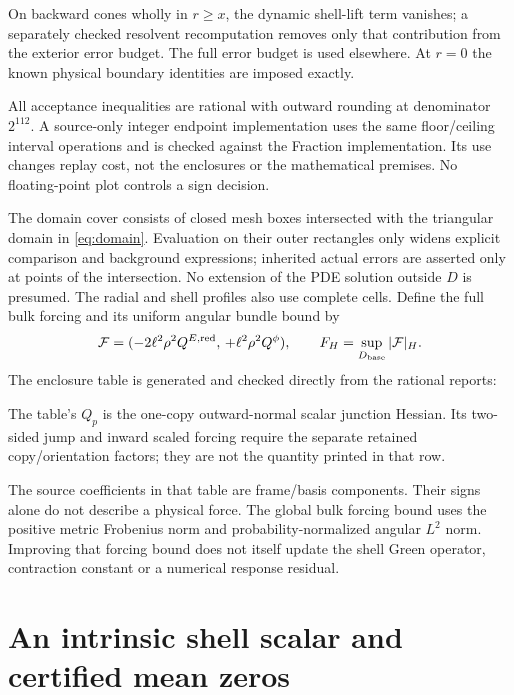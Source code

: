 \documentclass[11pt]{article}
\begin{document}
On backward cones wholly in $r\ge x$, the dynamic shell-lift term vanishes;
a separately checked resolvent recomputation removes only that contribution
from the exterior error budget. The full error budget is used elsewhere.
At $r=0$ the known physical boundary identities are imposed exactly.

All acceptance inequalities are rational with outward rounding at denominator
$2^{112}$. A source-only integer endpoint implementation uses the same
floor/ceiling interval operations and is checked against the Fraction
implementation. Its use changes replay cost, not the enclosures or the
mathematical premises. No floating-point plot controls a sign decision.

The domain cover consists of closed mesh boxes intersected with the triangular
domain in \eqref{eq:domain}. Evaluation on their outer rectangles only widens
explicit comparison and background expressions; inherited actual errors are
asserted only at points of the intersection. No extension of the PDE solution
outside $D$ is presumed. The radial and shell profiles also use complete cells.
Define the full bulk forcing and its uniform angular bundle bound by
\begin{equation}
 \mathcal F=(-2\ell^2\rho^2Q^{E,\mathrm{red}},\,+\ell^2\rho^2Q^\phi),
 \qquad F_H=\sup_{D_{\rm base}}|\mathcal F|_H.
\end{equation}
The enclosure table is generated and checked directly from the rational reports:


The table's $Q_p$ is the one-copy outward-normal scalar junction Hessian.
Its two-sided jump and inward scaled forcing require the separate retained
copy/orientation factors; they are not the quantity printed in that row.

The source coefficients in that table are frame/basis components. Their signs
alone do not describe a physical force. The global bulk forcing bound uses
the positive metric Frobenius norm and probability-normalized angular $L^2$
norm. Improving that forcing bound does not itself update the shell Green
operator, contraction constant or a numerical response residual.

\section{An intrinsic shell scalar and certified mean zeros}
\end{document}

